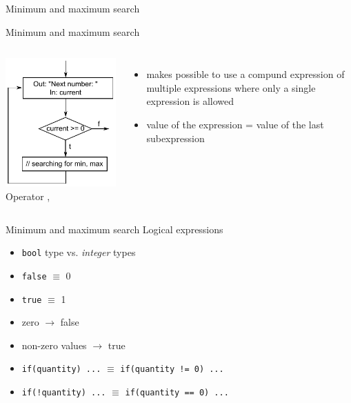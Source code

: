 \documentclass[usenames,dvipsnames,aspectratio=169]{beamer}
\newcommand{\kiemel}[1]{{\color{kiemelesszin}#1}}
\begin{document}
\begin{frame}{Minimum and maximum search}
  \begin{exampleblock}{}
    \scriptsize
    \vspace{-.3cm}
    
    \vspace{-.3cm}
  \end{exampleblock}
\end{frame}

\begin{frame}{Minimum and maximum search}
  \begin{columns}[c]
      \includegraphics{comma.pdf}
      Operator ,
      \begin{itemize}
        \item makes possible to use a compund expression of multiple expressions where only a single expression is allowed
        \item value of the expression = value of the last subexpression
      \end{itemize}
  \end{columns}
\end{frame}

\begin{frame}{Minimum and maximum search}
  Logical expressions
  \begin{itemize}
    \item \texttt{bool} type vs. \emph{integer} types
    \item \texttt{false} \kiemel{$\equiv$} 0
    \item \texttt{true} \kiemel{$\equiv$} 1
    \item zero $\to$ false
    \item non-zero values $\to$ true
    \item \texttt{if(quantity) ...} \kiemel{$\equiv$} \texttt{if(quantity != 0) ...}
    \item \texttt{if(!quantity) ...} \kiemel{$\equiv$} \texttt{if(quantity == 0) ...}
  \end{itemize}
\end{frame}
\end{document}
